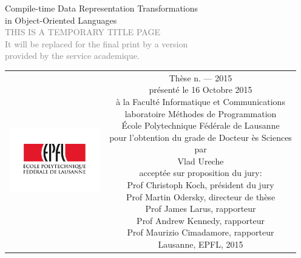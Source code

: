 \begin{titlepage}
\begin{center}
\sffamily


\null\vspace{2cm}
{\huge Compile-time Data Representation Transformations\\[12pt] in Object-Oriented Languages} \\[24pt]
\textcolor{gray}{\small{THIS IS A TEMPORARY TITLE PAGE \\ It will be replaced for the final print by a version \\ provided by the service academique.}}

\vfill

\begin{tabular} {cc}
\parbox{0.3\textwidth}{\includegraphics[width=4cm]{images/epfl}}
&
\parbox{0.7\textwidth}{%
	Thèse n. --- 2015\\
	présenté le 16 Octobre 2015\\
	à la Faculté Informatique et Communications\\
	laboratoire Méthodes de Programmation\\[2em]
%
	École Polytechnique Fédérale de Lausanne\\[6pt]
	pour l'obtention du grade de Docteur ès Sciences\\
	par\\ [4pt]
	\null \hspace{3em} Vlad Ureche\\[9pt]
%
\small
acceptée sur proposition du jury:\\[4pt]
%
    Prof Christoph Koch, président du jury\\
    Prof Martin Odersky, directeur de thèse\\
    Prof James Larus, rapporteur\\
    Prof Andrew Kennedy, rapporteur\\
    Prof Maurizio Cimadamore, rapporteur\\[12pt]
%
Lausanne, EPFL, 2015}
\end{tabular}
\end{center}
\vspace{2cm}
\end{titlepage}



